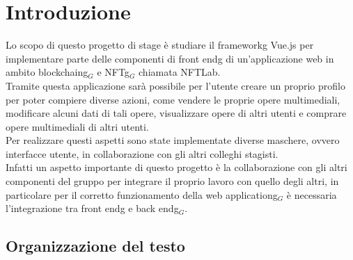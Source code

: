 
\chapter{Introduzione}
\label{cap:introduzione}

Lo scopo di questo progetto di stage è studiare il \gls{frameworkg} Vue.js per implementare parte delle componenti di \gls{front endg} di un'applicazione web in ambito \gls{blockchaing}$_G$ e \gls{NFTg}$_G$ chiamata NFTLab. \\
Tramite questa applicazione sarà possibile per l'utente creare un proprio profilo per poter compiere diverse azioni, come vendere le proprie opere multimediali, modificare alcuni dati di tali opere, visualizzare opere di altri utenti e comprare opere multimediali di altri utenti. \\
Per realizzare questi aspetti sono state implementate diverse maschere, ovvero interfacce utente, in collaborazione con gli altri colleghi stagisti.\\
Infatti un aspetto importante di questo progetto è la collaborazione con gli altri componenti del gruppo per integrare il proprio lavoro con quello degli altri, in particolare per il corretto funzionamento della \gls{web applicationg}$_G$ è necessaria l'integrazione tra \gls{front endg} e \gls{back endg}$_G$.


\section{Organizzazione del testo}
\label{sec:organizzazione-testo}

